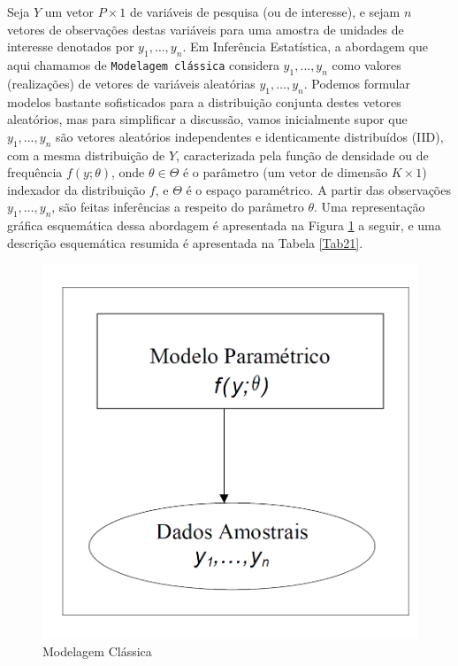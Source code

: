 \documentclass[]{book}
\numberwithin{example}{chapter}
\numberwithin{remark}{chapter}
\numberwithin{definition}{chapter}
\begin{document}
Seja \(Y\) um vetor \(P \times 1\) de variáveis de pesquisa (ou de
interesse), e sejam \(n\) vetores de observações destas variáveis para
uma amostra de unidades de interesse denotados por \(y_1,\ldots ,y_n\).
Em Inferência Estatística, a abordagem que aqui chamamos de
\texttt{Modelagem\ clássica} considera \(y_1,\ldots ,y_n\) como valores
(realizações) de vetores de variáveis aleatórias \(y_1,\ldots ,y_n\).
Podemos formular modelos bastante sofisticados para a distribuição
conjunta destes vetores aleatórios, mas para simplificar a discussão,
vamos inicialmente supor que \(y_1,\ldots ,y_n\) são vetores aleatórios
independentes e identicamente distribuídos (IID), com a mesma
distribuição de \(Y\), caracterizada pela função de densidade ou de
frequência \(f(y;\theta)\), onde \(\theta \in \Theta\) é o parâmetro (um
vetor de dimensão \(K \times 1\)) indexador da distribuição \(f\), e
\(\Theta\) é o espaço paramétrico. A partir das observações
\(y_1,\ldots ,y_n\), são feitas inferências a respeito do parâmetro
\(\theta\). Uma representação gráfica esquemática dessa abordagem é
apresentada na Figura \ref{fig:modclas} a seguir, e uma descrição
esquemática resumida é apresentada na Tabela \ref{Tab21}.

\begin{figure}[htbp]
\centering
\includegraphics{Figuras/fig21.png}
\caption{\label{fig:modclas}Modelagem Clássica}
\end{figure}
\end{document}
